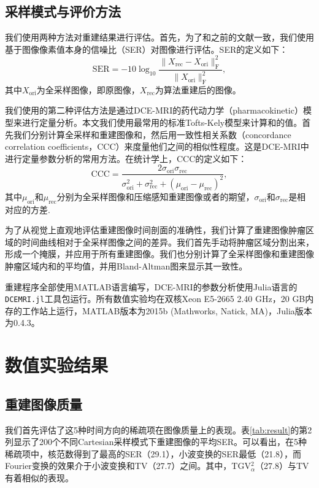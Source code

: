 \subsection{采样模式与评价方法}
我们使用两种方法对重建结果进行评估。首先，为了和之前的文献一致，我们使用基于图像像素值本身的信噪比（SER）对图像进行评估。SER的定义如下：
\begin{equation}
\mathrm{SER} = -10 \log_{10}\frac{\|X_\mathrm{rec}-X_\mathrm{ori}\|_\mathrm{F}^2}{\|X_\mathrm{ori}\|_\mathrm{F}^2},
\end{equation}
其中$X_{\mathrm{ori}}$为全采样图像，即原图像，$X_{\mathrm{rec}}$为算法重建后的图像。

我们使用的第二种评估方法是通过DCE-MRI的药代动力学（pharmacokinetic）模型来进行定量分析。本文我们使用最常用的标准Tofts-Kely模型\cite{tofts}来计算\kt 和\Ve 的值。首先我们分别计算全采样和重建图像\kt 和\Ve，然后用一致性相关系数（concordance correlation coefficients，CCC）来度量他们之间的相似性程度。这是DCE-MRI中进行定量参数分析的常用方法。在统计学上，CCC的定义如下：
\begin{equation}
\mathrm{CCC} = \frac{2\sigma_\mathrm{ori} \sigma_\mathrm{rec}}{\sigma_\mathrm{ori}^2+\sigma_\mathrm{rec}^2+(\mu_\mathrm{ori}-\mu_\mathrm{rec})^2},
\end{equation}
其中$\mu_\mathrm{ori}$和$\mu_\mathrm{rec}$分别为全采样图像和压缩感知重建图像\kt 或者\Ve 的期望，$\sigma_\mathrm{ori}$和$\sigma_\mathrm{rec}$是相对应的方差.

为了从视觉上直观地评估重建图像时间剖面的准确性，我们计算了重建图像肿瘤区域的时间曲线相对于全采样图像之间的差异。我们首先手动将肿瘤区域分割出来，形成一个掩膜，并应用于所有重建图像。我们也分别计算了全采样图像和重建图像肿瘤区域内\kt 和\Ve 的平均值，并用Bland-Altman图来显示其一致性。

重建程序全部使用MATLAB语言编写，DCE-MRI的参数分析使用Julia语言的\texttt{DCEMRI.jl}\cite{Smith2015}工具包运行。所有数值实验均在双核Xeon E5-2665 2.40 GHz，20 GB内存的工作站上运行，MATLAB版本为2015b (Mathworks, Natick, MA)，Julia版本为0.4.3。

\section{数值实验结果}
\subsection{重建图像质量}
我们首先评估了这5种时间方向的稀疏项在图像质量上的表现。表\ref{tab:result}的第2列显示了200个不同Cartesian采样模式下重建图像的平均SER。可以看出，在5种稀疏项中，核范数得到了最高的SER（29.1），小波变换的SER最低（21.8），而Fourier变换的效果介于小波变换和TV（27.7）之间。其中，TGV$_\alpha^2$（27.8）与TV有着相似的表现。

